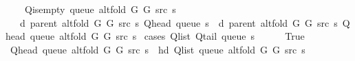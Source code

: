 \begin{isabellebody}
\ \ \ {\isachardoublequoteopen}{\isasymnot}\ Q{\isacharunderscore}{\kern0pt}is{\isacharunderscore}{\kern0pt}empty\ {\isacharparenleft}{\kern0pt}queue\ {\isacharparenleft}{\kern0pt}alt{\isacharunderscore}{\kern0pt}fold\ G{}\ G{}\ src\ s{\isacharparenright}{\kern0pt}{\isacharparenright}{\kern0pt}{\isachardoublequoteclose}\isanewline
\ \ \ {\isachardoublequoteopen}d\ {\isacharparenleft}{\kern0pt}parent\ {\isacharparenleft}{\kern0pt}alt{\isacharunderscore}{\kern0pt}fold\ G{}\ G{}\ src\ s{\isacharparenright}{\kern0pt}{\isacharparenright}{\kern0pt}\ {\isacharparenleft}{\kern0pt}Q{\isacharunderscore}{\kern0pt}head\ {\isacharparenleft}{\kern0pt}queue\ s{\isacharparenright}{\kern0pt}{\isacharparenright}{\kern0pt}\ {\isasymle}\ d\ {\isacharparenleft}{\kern0pt}parent\ {\isacharparenleft}{\kern0pt}alt{\isacharunderscore}{\kern0pt}fold\ G{}\ G{}\ src\ s{\isacharparenright}{\kern0pt}{\isacharparenright}{\kern0pt}\ {\isacharparenleft}{\kern0pt}Q{\isacharunderscore}{\kern0pt}head\ {\isacharparenleft}{\kern0pt}queue\ {\isacharparenleft}{\kern0pt}alt{\isacharunderscore}{\kern0pt}fold\ G{}\ G{}\ src\ s{\isacharparenright}{\kern0pt}{\isacharparenright}{\kern0pt}{\isacharparenright}{\kern0pt}{\isachardoublequoteclose}%
\endisataginvisible
{\isafoldinvisible}%
%
\isadeliminvisible
\isanewline
%
\endisadeliminvisible
%
\isadelimproof
%
\endisadelimproof
%
\isatagproof
{}\isamarkupfalse%
\ {\isacharparenleft}{\kern0pt}cases\ {\isachardoublequoteopen}Q{\isacharunderscore}{\kern0pt}list\ {\isacharparenleft}{\kern0pt}Q{\isacharunderscore}{\kern0pt}tail\ {\isacharparenleft}{\kern0pt}queue\ s{\isacharparenright}{\kern0pt}{\isacharparenright}{\kern0pt}\ {\isacharequal}{\kern0pt}\ {\isacharbrackleft}{\kern0pt}{\isacharbrackright}{\kern0pt}{\isachardoublequoteclose}{\isacharparenright}{\kern0pt}\isanewline
\ \ \isamarkupfalse%
\ True\isanewline
\ \ \isamarkupfalse%
\ {\isachardoublequoteopen}Q{\isacharunderscore}{\kern0pt}head\ {\isacharparenleft}{\kern0pt}queue\ {\isacharparenleft}{\kern0pt}alt{\isacharunderscore}{\kern0pt}fold\ G{}\ G{}\ src\ s{\isacharparenright}{\kern0pt}{\isacharparenright}{\kern0pt}\ {\isacharequal}{\kern0pt}\ hd\ {\isacharparenleft}{\kern0pt}Q{\isacharunderscore}{\kern0pt}list\ {\isacharparenleft}{\kern0pt}queue\ {\isacharparenleft}{\kern0pt}alt{\isacharunderscore}{\kern0pt}fold\ G{}\ G{}\ src\ s{\isacharparenright}{\kern0pt}{\isacharparenright}{\kern0pt}{\isacharparenright}{\kern0pt}{\isachardoublequoteclose}\isanewline

\end{isabellebody}
